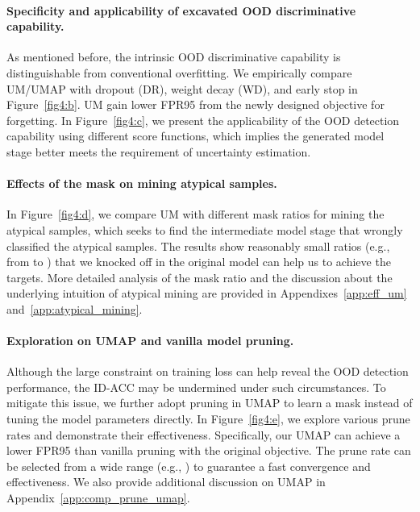 \documentclass{article}
\theoremstyle{plain}
\theoremstyle{definition}
\theoremstyle{remark}
\begin{document}
\paragraph{Specificity and applicability of excavated OOD discriminative capability.} As mentioned before, the intrinsic OOD discriminative capability is distinguishable from conventional overfitting. We empirically compare UM/UMAP with dropout (DR), weight decay (WD), and early stop in Figure~\ref{fig4:b}. UM gain lower FPR95 from the newly designed objective for forgetting. In Figure~\ref{fig4:c}, we present the applicability of the OOD detection capability using different score functions, which implies the generated model stage better meets the requirement of uncertainty estimation.





\paragraph{Effects of the mask on mining atypical samples.} In Figure~\ref{fig4:d}, we compare UM with different mask ratios for mining the atypical samples, which seeks to find the intermediate model stage that wrongly classified the atypical samples. The results show reasonably small ratios (e.g., from  to ) that we knocked off in the original model can help us to achieve the targets. More detailed analysis of the mask ratio and the discussion about the underlying intuition of atypical mining are provided in Appendixes~\ref{app:eff_um} and~\ref{app:atypical_mining}.







\paragraph{Exploration on UMAP and vanilla model pruning.} Although the large constraint on training loss can help reveal the OOD detection performance, the ID-ACC may be undermined under such circumstances. To mitigate this issue, we further adopt pruning in UMAP to learn a mask instead of tuning the model parameters directly. In Figure~\ref{fig4:e}, we explore various prune rates  and demonstrate their effectiveness. Specifically, our UMAP can achieve a lower FPR95 than vanilla pruning with the original objective.
The prune rate can be selected from a wide range (e.g., ) to guarantee a fast convergence and effectiveness. We also provide additional discussion on UMAP in Appendix~\ref{app:comp_prune_umap}.
\end{document}
